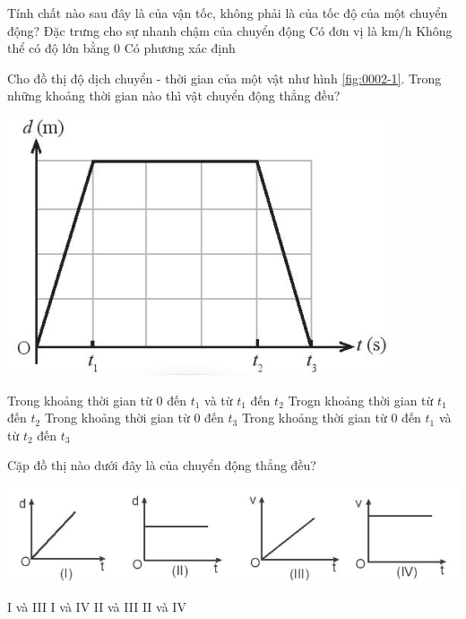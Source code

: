 \begin{ex}
	Tính chất nào sau đây là của vận tốc, không phải là của tốc độ của một chuyển động?
	\choice
	{Đặc trưng cho sự nhanh chậm của chuyển động}
	{Có đơn vị là $\si{\kilo\meter/\hour}$}
	{Không thể có độ lớn bằng 0}
	{\True Có phương xác định}
	\loigiai{}
\end{ex}

\begin{ex}
	Cho đồ thị độ dịch chuyển - thời gian của một vật như hình \ref{fig:0002-1}. Trong những khoảng thời gian nào thì vật chuyển động thẳng đều?
	\begin{center}
		\includegraphics[scale=0.4]{figs/G10Y25B5-1}
		\label{fig:0002-1}
	\end{center}
	\choice
	{Trong khoảng thời gian từ 0 đến $t_1$ và từ $t_1$ đến $t_2$}
	{Trogn khoảng thời gian từ $t_1$ đến $t_2$}
	{Trong khoảng thời gian từ $0$ đến $t_3$}
	{\True Trong khoảng thời gian từ 0 đến $t_1$ và từ $t_2$ đến $t_3$}
	\loigiai{}
\end{ex}

\begin{ex}
	Cặp đồ thị nào dưới đây là của chuyển động thẳng đều?
	\begin{center}
		\includegraphics[scale=0.6]{figs/G10Y25B5-2}
	\end{center}
	\choice
	{I và III}
	{\True I và IV}
	{II và III}
	{II và IV}
	\loigiai{}
\end{ex}


